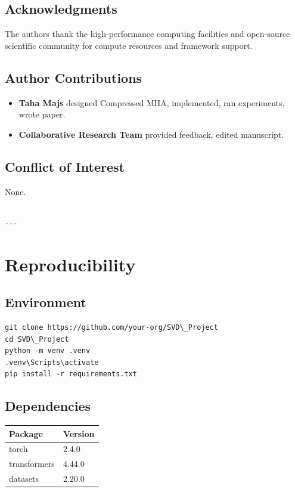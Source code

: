 \subsection{Acknowledgments}

The authors thank the high-performance computing facilities and open-source scientific community for compute resources and framework support.

\subsection{Author Contributions}

\begin{itemize}
\item \textbf{Taha Majs} designed Compressed MHA, implemented, ran experiments,
  wrote paper.
\item \textbf{Collaborative Research Team} provided feedback, edited manuscript.

\end{itemize}
\subsection{Conflict of Interest}

None.
\begin{lstlisting}

---
\end{lstlisting}

\section{Reproducibility}

\subsection{Environment}

\begin{lstlisting}
git clone https://github.com/your-org/SVD\_Project
cd SVD\_Project
python -m venv .venv
.venv\Scripts\activate
pip install -r requirements.txt
\end{lstlisting}

\subsection{Dependencies}

\begin{table}[H]
\centering
\small
\begin{tabular}{ll}
\toprule
\textbf{Package} & \textbf{Version} \\
\midrule
torch & 2.4.0 \\
transformers & 4.44.0 \\
datasets & 2.20.0 \\
\bottomrule
\end{tabular}
\end{table}

